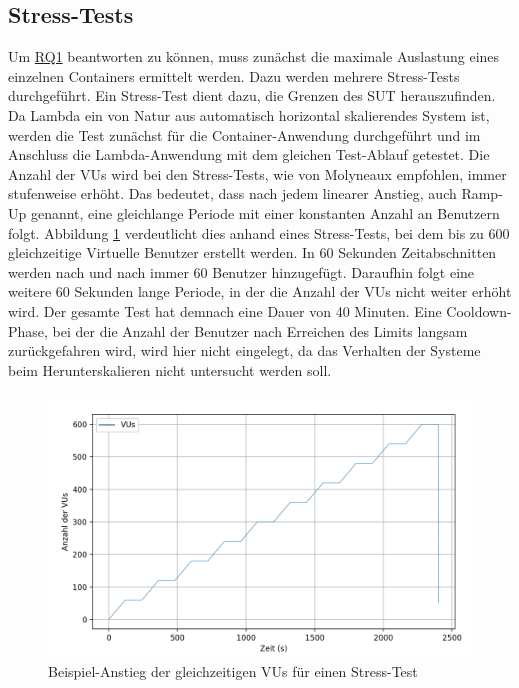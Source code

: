 \subsection{Stress-Tests}
Um \hyperref[tab:research-questions]{RQ1} beantworten zu können, muss zunächst die maximale Auslastung eines einzelnen Containers ermittelt werden. Dazu werden mehrere Stress-Tests durchgeführt. Ein Stress-Test dient dazu, die Grenzen des \ac{SUT} herauszufinden. Da Lambda ein von Natur aus automatisch horizontal skalierendes System ist, werden die Test zunächst für die Container-Anwendung durchgeführt und im Anschluss die Lambda-Anwendung mit dem gleichen Test-Ablauf getestet. Die Anzahl der \acp{VU} wird bei den Stress-Tests, wie von Molyneaux\cite{molyneaux_art_2014} empfohlen, immer stufenweise erhöht. Das bedeutet, dass nach jedem linearer Anstieg, auch Ramp-Up genannt, eine gleichlange Periode mit einer konstanten Anzahl an Benutzern folgt. Abbildung \ref{fig:stress-vus-example} verdeutlicht dies anhand eines Stress-Tests, bei dem bis zu 600 gleichzeitige Virtuelle Benutzer erstellt werden. In 60 Sekunden Zeitabschnitten werden nach und nach immer 60 Benutzer hinzugefügt. Daraufhin folgt eine weitere 60 Sekunden lange Periode, in der die Anzahl der \acp{VU} nicht weiter erhöht wird. Der gesamte Test hat demnach eine Dauer von 40 Minuten. Eine Cooldown-Phase, bei der die Anzahl der Benutzer nach Erreichen des Limits langsam zurückgefahren wird, wird hier nicht eingelegt, da das Verhalten der Systeme beim Herunterskalieren nicht untersucht werden soll.

\begin{figure}[H]
    \includegraphics[width=\textwidth]{img/stress-vus-example.png}
    \caption[Beispiel-Anstieg der gleichzeitigen VUs für einen Stress-Test]{Beispiel-Anstieg der gleichzeitigen VUs für einen Stress-Test}
    \label{fig:stress-vus-example}
\end{figure}

